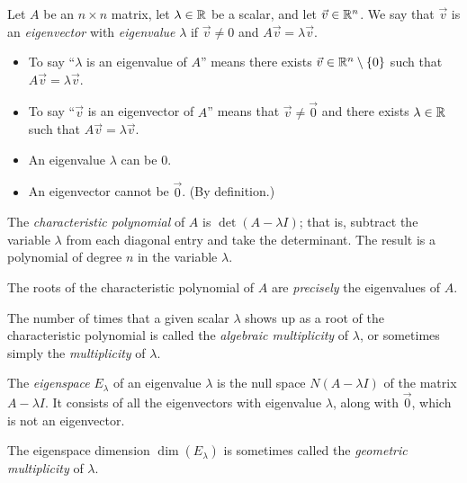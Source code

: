 \begin{definition}
	Let $A$ be an $n \times n$ matrix, let $\lambda \in {\mathbb{R}}$ be a scalar, and let
	$\vec{v} \in {\mathbb{R}}^n$. We say that $\vec{v}$ is an \emph{eigenvector} with
	\emph{eigenvalue} $\lambda$ if $\vec{v} \neq 0$ and $A \vec{v} = \lambda
	\vec{v}$.
	\begin{itemize}
		\item To say ``$\lambda$ is an eigenvalue of $A$'' means there exists
			$\vec{v} \in {\mathbb{R}}^n \setminus \{0\}$ such that $A \vec{v} = \lambda
			\vec{v}$.
		\item To say ``$\vec{v}$ is an eigenvector of $A$'' means that $\vec{v} \neq
			\vec{0}$ and there exists $\lambda \in {\mathbb{R}}$ such that $A \vec{v} = \lambda
			\vec{v}$.
		\item An eigenvalue $\lambda$ can be 0.
		\item An eigenvector cannot be $\vec{0}$. (By definition.)
	\end{itemize}
\end{definition}

\begin{definition}
	The \emph{characteristic polynomial} of $A$ is $\det(A - \lambda I)$; that is,
	subtract the variable $\lambda$ from each diagonal entry and take the
	determinant. The result is a polynomial of degree $n$ in the variable
	$\lambda$.
\end{definition}

\begin{fact}
	The roots of the characteristic polynomial of $A$ are \emph{precisely} the
	eigenvalues of $A$.
\end{fact}

\begin{definition}
	The number of times that a given scalar $\lambda$ shows up as a root of the
	characteristic polynomial is called the \emph{algebraic multiplicity} of
	$\lambda$, or sometimes simply the \emph{multiplicity} of $\lambda$.
\end{definition}

\begin{definition}
	The \emph{eigenspace} $E_\lambda$ of an eigenvalue $\lambda$ is the null space
	$N(A - \lambda I)$ of the matrix $A - \lambda I$. It consists of all the
	eigenvectors with eigenvalue $\lambda$, along with $\vec{0}$, which is not an
	eigenvector.
\end{definition}

\begin{definition}
	The eigenspace dimension $\dim(E_\lambda)$ is sometimes called the
	\emph{geometric multiplicity} of $\lambda$.
\end{definition}


